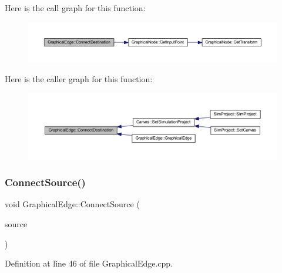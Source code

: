 Here is the call graph for this function\+:
\nopagebreak
\begin{figure}[H]
\begin{center}
\leavevmode
\includegraphics[width=350pt]{class_graphical_edge_a41868fd50c413744e61a549f1cef6a79_cgraph}
\end{center}
\end{figure}
Here is the caller graph for this function\+:
\nopagebreak
\begin{figure}[H]
\begin{center}
\leavevmode
\includegraphics[width=350pt]{class_graphical_edge_a41868fd50c413744e61a549f1cef6a79_icgraph}
\end{center}
\end{figure}
\mbox{\label{class_graphical_edge_a9f2e7f370705c390ad67f5b18ed80a00}} 
\subsubsection{\texorpdfstring{Connect\+Source()}{ConnectSource()}}
{\footnotesize\ttfamily void Graphical\+Edge\+::\+Connect\+Source (\begin{DoxyParamCaption}\item[{\hyperlink{class_graphical_node}{Graphical\+Node} $\ast$}]{source }\end{DoxyParamCaption})}



Definition at line 46 of file Graphical\+Edge.\+cpp.

